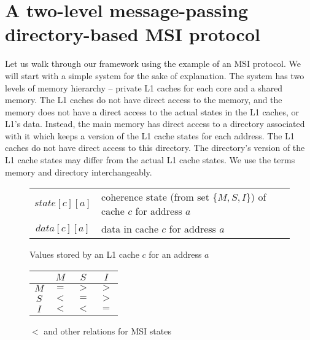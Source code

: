 \section{A two-level message-passing directory-based MSI protocol}
\label{sec:msi}

\newcommand{\fourAngle}[6]{\text{$#1\langle#2\rightarrow#3,#4,#5\rightarrow#6\rangle$}}
\newcommand{\threeAngle}[5]{\text{$#1\langle#2\rightarrow#3,#4,#5\rangle$}}

\newcommand{\Req}[4]{\threeAngle{Req}{#1}{#2}{#3}{#4}}
\newcommand{\Resp}[4]{\threeAngle{Resp}{#1}{#2}{#3}{#4}}

\newcommand{\msg}[5]{\text{$#1 \langle #2 \rightarrow #3, #4, #5 \rangle$}}
\newcommand{\Data}[4]{\msg{Data}{#1}{#2}{#3}{#4}}
\newcommand{\Mesg}[4]{\msg{Mesg}{#1}{#2}{#3}{#4}}
\newcommand{\DirInv}{\emph{DirInv}}
%

Let us walk through our framework using the example of an MSI protocol.  We will
start with a simple system for the sake of explanation.  The system has two
levels of memory hierarchy -- private L1 caches for each core and a shared
memory. The L1 caches do not have direct access to the memory, and the memory
does not have a direct access to the actual states in the  L1 caches, or L1's
data. Instead, the main memory has direct access to a directory associated with
it which keeps a version of the L1 cache states for each address. The L1 caches
do not have direct access to this directory. The directory's version of the L1
cache states may differ from the actual L1 cache states. We use the terms memory
and directory interchangeably.

\begin{figure}
\begin{tabularx}{\linewidth}{|cX|}
\hline
$state[c][a]$ & coherence state (from set $\{M, S, I\}$) of cache $c$ for address $a$\\
$data[c][a]$ & data in cache $c$ for address $a$\\
\hline \end{tabularx}
\caption{Values stored by an L1 cache $c$ for an address $a$}
\label{table:lineinfo}
\end{figure}

\begin{wrapfigure}{r}{.4\linewidth}
\centering
\begin{tabular}{|c|ccc|}
\hline
& $M$ & $S$ & $I$\\
\hline
$M$ & $=$ & $>$ & $>$\\
$S$ & $<$ & $=$ & $>$\\
$I$ & $<$ & $<$ & $=$\\
\hline
\end{tabular}
\caption{$<$ and other relations for MSI states}
\label{msi<}
\end{wrapfigure}

